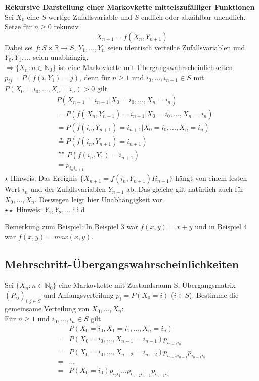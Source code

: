 \documentclass[a4paper,12pt]{article}
\begin{document}
\begin{tcolorbox}[breakable, colframe=blue, colback=white, title=Beispiel 5]
	\textbf{Rekursive Darstellung einer Markovkette mittelszufälliger Funktionen}
	Sei $X_0$ eine $S$-wertige Zufallsvariable und $S$ endlich oder abzählbar unendlich. Setze für $n \geq 0$ rekursiv 
	$$
	X_{n+1} = f(X_n,Y_{n+1})
	$$
	Dabei sei $ f: S \times \mathbb{R} \to S$, $Y_1, ..., Y_n$ seien identisch verteilte Zufallsvariablen und $Y_0, Y_1, ...$ seien unabhängig.\\
	$\Rightarrow \{X_n: n \in  \mathbb{N}_0\}$ ist eine Markovkette mit Übergangswahrscheinlichkeiten $p_{ij}=P(f(i,Y_1)=j)$, denn für $n \geq 1$ und $i_0, ..., i_{n+1} \in S$ mit $P(X_0 = i_0, ..., X_n = i_n)>0$ gilt
	\begin{align*}
		& P(X_{n+1}=i_{n+1}|X_0 = i_0, ..., X_n = i_n) \\
		&=  P(f(X_n, Y_{n+1})=i_{n+1}|X_0 = i_0, ..., X_n = i_n) \\
		&=  P(f(i_n, Y_{n+1})=i_{n+1}|X_0 = i_0, ..., X_n = i_n) \\
		& \overset{\star}{=}  P(f(i_n, Y_{n+1})=i_{n+1}) \\
		&\overset{\star \star}{=}   P(f(i_n, Y_1)=i_{n+1}) \\
		&=  p_{i_ni_{n+1}}
	\end{align*}
	$\star$ Hinweis: Das Ereignis $\{X_{n+1} =f(i_n,Y_{n+1})Ii_{n+1}\}$ hängt von einem festen Wert $i_n$ und der Zufallsvariablen $Y_{n+1}$ ab.
	Das gleiche gilt natürlich auch für $X_0, ..., X_n$. Deswegen leigt hier Unabhängigkeit vor.\\
	$\star \star$ Hinweis: $Y_1, Y_2, ...$ i.i.d
\end{tcolorbox}

Bemerkung zum Beispiel: In Beispiel 3 war $f(x,y) = x+y$ und in Beispiel 4 war $f(x,y) = max(x,y)$.



\subsection{Mehrschritt-Übergangswahrscheinlichkeiten}
Sei $\{X_n: n \in \mathbb{N}_0\}$ eine Markovkette mit Zustandsraum S, Übergangsmatrix $(P_{ij})_{i,j \in S}$ und 
Anfangsverteilung $p_i = P(X_0 = i)$ ($i \in S$).
Bestimme die gemeinsame Verteilung von $X_0, ..., X_n$:\\
 Für $n \geq 1$ und $i_0, ..., i_n \in S$ gilt
\begin{align*}
&  P(X_0 = i_0, X_1 = i_1, ..., X_n = i_n)\\
=&   P(X_0 = i_0, ..., X_{n-1}=i_{n-1})p_{i_{n-1}i_n}\\
=&  P(X_0 = i_0, ..., X_{n-2} = i_{n-2})p_{i_{n-2}i_{n-1}}p_{i_{n-1}i_n}\\
=&   \dots \\
=&   P(X_0 = i_0)p_{i_0i_1}...p_{i_{n-2}i_{n-1}}p_{i_{n-1}i_n}
\end{align*}
\end{document}
